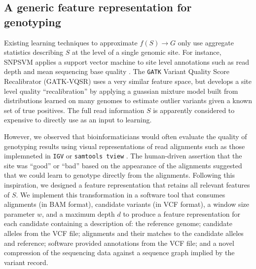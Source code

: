 \documentclass{article}
\begin{document}
\subsection{A generic feature representation for genotyping}

Existing learning techniques to approximate $f(S) \to G$ only use aggregate statistics describing $S$ at the level of a single genomic site.
For instance, SNPSVM applies a support vector machine to site level annotations such as read depth and mean sequencing base quality \cite{o2013support}.
The {\tt GATK} Variant Quality Score Recalibrator (GATK-VQSR) uses a very similar feature space, but develops a site level quality ``recalibration'' by applying a guassian mixture model built from distributions learned on many genomes to estimate outlier variants given a known set of true positives.
The full read information $S$ is apparently considered to expensive to directly use as an input to learning.

However, we observed that bioinformaticians would often evaluate the quality of genotyping results using visual representations of read alignments such as those implemneted in {\tt IGV} or {\tt samtools tview} \cite{robinson2011integrative, samtools}.
The human-driven assertion that the site was ``good'' or ``bad'' based on the appearance of the alignments suggested that we could learn to genotype directly from the alignments.
Following this inspiration, we designed a feature representation that retains all relevant features of $S$.
We implement this transformation in a software tool that consumes alignments (in BAM format), candidate variants (in VCF format), a window size parameter $w$, and a maximum depth $d$ to produce a feature representation for each candidate containing a description of: the reference genome; candidate alleles from the VCF file; alignments and their matches to the candidate alleles and reference; software provided annotations from the VCF file; and a novel compression of the sequencing data against a sequence graph implied by the variant record.
\end{document}
